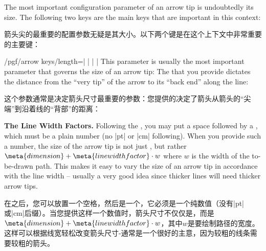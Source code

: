 The most important configuration parameter of an arrow tip is undoubtedly its
size. The following two keys are the main keys that are important in this
context:

箭头尖的最重要的配置参数无疑是其大小。以下两个键是在这个上下文中非常重要的主要键：

\begin{key}{/pgf/arrow keys/length=| |%
        | |}
        \label{length-arrow-key}%
    This parameter is usually the most important parameter that governs the
    size of an arrow tip: The  that you provide dictates the
    distance from the ``very tip'' of the arrow to its ``back end'' along the
    line:
    
    这个参数通常是决定箭头尺寸最重要的参数：您提供的决定了箭头从箭头的“尖端”到沿着线的“背部”的距离：
\begin{codeexample}[preamble={\usetikzlibrary{arrows.meta}}]
\end{codeexample}
\begin{codeexample}[preamble={\usetikzlibrary{arrows.meta}}]
\end{codeexample}
\begin{codeexample}[preamble={\usetikzlibrary{arrows.meta}}]
\end{codeexample}

    \medskip
    \noindent \textbf{The Line Width Factors.}
    Following the , you may put a space followed by a
    , which must be a plain number (no |pt| or |cm|
    following). When you provide such a number, the size of the arrow tip is
    not just , but rather $\meta{dimension} + \meta{line width
    factor}\cdot w$ where $w$ is the width of the to-be-drawn path. This makes
    it easy to vary the size of an arrow tip in accordance with the line width
    -- usually a very good idea since thicker lines will need thicker arrow
    tips.

    在之后，您可以放置一个空格，然后是一个，它必须是一个纯数值（没有|pt|或|cm|后缀）。当您提供这样一个数值时，箭头尺寸不仅仅是，而是$\meta{dimension} + \meta{line width factor}\cdot w$，其中$w$是要绘制路径的宽度。这样可以根据线宽轻松改变箭头尺寸-通常是一个很好的主意，因为较粗的线条需要较粗的箭头。


\end{key}
